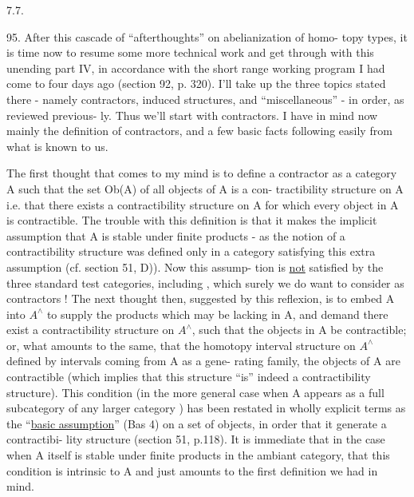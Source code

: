 7.7. 

95. After this cascade of ``afterthoughts'' on abelianization of homo-%
topy types, it is time now to resume some more technical work\hand{,} and get
through with this unending part IV, in accordance with the short range
working program I had come to four days ago (section 92, p. 320). I'll
take up the three topics stated there - namely contractors, induced
structures, and ``miscellaneous'' - in  order, as reviewed previous-%
ly. Thus we'll start with contractors. I have in mind now mainly the
definition of contractors, and a few basic facts following easily from
what is  known to us.


 The first thought that comes to my mind is to define a contractor
as a category A such that the set  Ob(A) of all objects of A is a con-%
tractibility structure on A\hand{,}  i.e. that there exists
 a contractibility structure on A for which every object in
A is contractible. The trouble with this definition is that it makes
the implicit assumption that A is stable under finite products - as the
notion of a contractibility structure was defined only in a category
satisfying this extra assumption (cf. section 51, D)). Now this assump-%
tion is \uline{not} satisfied by the three standard test categories, including
\hand{$\Delta$}, which surely we do want to consider as contractors ! The next
thought then, suggested by this reflexion, is to embed A into $A^{\wedge}$ to
supply the products which may be lacking in A, and demand there exist
a contractibility structure on $A^{\wedge}$, such that the objects in A  be
contractible; or, what amounts to the same, that  the homotopy
interval structure on $A^{\wedge}$ defined by intervals coming from A as a gene-%
rating family,  the objects of
A are contractible (which implies that this structure ``is'' indeed a
contractibility structure). This condition (in the more general case\unsure{\hand{,}}
when A appears as a full subcategory of any larger category ) has
been restated in wholly explicit terms as the ``\uline{basic assumption}''
(Bas 4) on a set of objects, in order that it generate a contractibi-%
lity structure (section 51, p.118). It is immediate that in the case
when A itself is stable under finite products in the ambiant category,
that this condition is intrinsic to A and just  amounts to the
first definition we had in mind.

